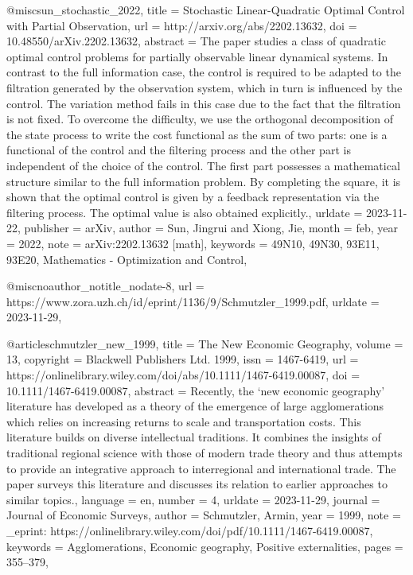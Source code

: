 {{{@misc{sun_stochastic_2022,
	title = {Stochastic {Linear}-{Quadratic} {Optimal} {Control} with {Partial} {Observation}},
	url = {http://arxiv.org/abs/2202.13632},
	doi = {10.48550/arXiv.2202.13632},
	abstract = {The paper studies a class of quadratic optimal control problems for partially observable linear dynamical systems. In contrast to the full information case, the control is required to be adapted to the filtration generated by the observation system, which in turn is influenced by the control. The variation method fails in this case due to the fact that the filtration is not fixed. To overcome the difficulty, we use the orthogonal decomposition of the state process to write the cost functional as the sum of two parts: one is a functional of the control and the filtering process and the other part is independent of the choice of the control. The first part possesses a mathematical structure similar to the full information problem. By completing the square, it is shown that the optimal control is given by a feedback representation via the filtering process. The optimal value is also obtained explicitly.},
	urldate = {2023-11-22},
	publisher = {arXiv},
	author = {Sun, Jingrui and Xiong, Jie},
	month = feb,
	year = {2022},
	note = {arXiv:2202.13632 [math]},
	keywords = {49N10, 49N30, 93E11, 93E20, Mathematics - Optimization and Control},
}

@misc{noauthor_notitle_nodate-8,
	url = {https://www.zora.uzh.ch/id/eprint/1136/9/Schmutzler_1999.pdf},
	urldate = {2023-11-29},
}

@article{schmutzler_new_1999,
	title = {The {New} {Economic} {Geography}},
	volume = {13},
	copyright = {Blackwell Publishers Ltd. 1999},
	issn = {1467-6419},
	url = {https://onlinelibrary.wiley.com/doi/abs/10.1111/1467-6419.00087},
	doi = {10.1111/1467-6419.00087},
	abstract = {Recently, the ‘new economic geography’ literature has developed as a theory of the emergence of large agglomerations which relies on increasing returns to scale and transportation costs. This literature builds on diverse intellectual traditions. It combines the insights of traditional regional science with those of modern trade theory and thus attempts to provide an integrative approach to interregional and international trade. The paper surveys this literature and discusses its relation to earlier approaches to similar topics.},
	language = {en},
	number = {4},
	urldate = {2023-11-29},
	journal = {Journal of Economic Surveys},
	author = {Schmutzler, Armin},
	year = {1999},
	note = {\_eprint: https://onlinelibrary.wiley.com/doi/pdf/10.1111/1467-6419.00087},
	keywords = {Agglomerations, Economic geography, Positive externalities},
	pages = {355--379},
}

}}}
